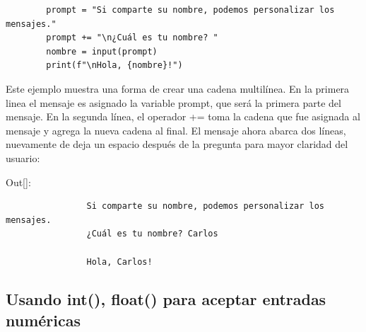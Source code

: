 	\hspace{-2.3cm}{\ttfamily \scriptsize saludo.py}\vspace{-0.5cm}
	\begin{lstlisting}		
		prompt = "Si comparte su nombre, podemos personalizar los mensajes."
		prompt += "\n¿Cuál es tu nombre? "
		nombre = input(prompt)
		print(f"\nHola, {nombre}!")	
	\end{lstlisting}	
	
	Este ejemplo muestra una forma de crear una cadena multilínea. En la primera linea el mensaje
	es asignado  la variable prompt, que será la primera parte del mensaje. En la segunda
	línea, el operador  {\ttfamily += } toma la cadena que fue asignada al mensaje y agrega
	la nueva cadena al final. El mensaje ahora abarca dos líneas, nuevamente de deja un espacio después de la pregunta para mayor claridad del usuario:
	
	{\ttfamily\scriptsize\scriptsize 
		\hspace{-0.65cm}Out[]: \vspace{-0.3cm}	
		{\color{blue} 	
			\begin{verbatim}
				Si comparte su nombre, podemos personalizar los mensajes.
				¿Cuál es tu nombre? Carlos
				
				Hola, Carlos!
			\end{verbatim}
	}}
	
	\subsection{Usando int(), float() para aceptar entradas numéricas}
	
